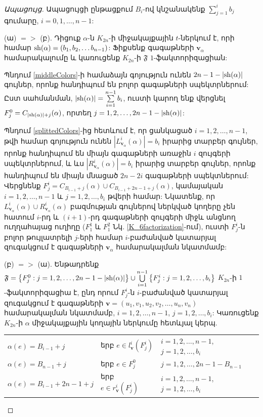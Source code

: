 \begin{proof}[Ապացույց]
Ապացույցի ընթացքում $B_i$-ով կնշանակենք $\sum\limits_{j=1}^{i}b_j$ գումարը, $i=0,1,\ldots,n-1$:

\begin{description}
\item{(ա) $=>$ (բ)}. Դիցուք $\alpha$-ն $K_{2n}$-ի միջակայքային $t$-ներկում է, որի համար ${\rm sh}(\alpha) = (b_1, b_2, \ldots b_{n-1})$: Ֆիքսենք գագաթների $\mathbf{v}_\alpha$ համարակալումը և կառուցենք $K_{2n}$-ի $\mathfrak{F}$ $1$-ֆակտորիզացիան: 

Պնդում \ref{middleColors}-ի համաձայն գոյություն ունեն $2n-1-|{\rm sh}(\alpha)|$ գույներ, որոնք հանդիպում են բոլոր գագաթների սպեկտրներում: Ըստ սահմանման, $|{\rm sh}(\alpha)| = \sum\limits_{i=1}^{n-1}b_i$, ուստի կարող ենք վերցնել $F_j^0 = C_{|{\rm sh}(\alpha)|+j}(\alpha)$, որտեղ $j=1,2,\ldots,2n-1-|{\rm sh}(\alpha)|$:

Պնդում \ref{splittedColors}-ից հետևում է, որ ցանկացած $i=1,2,\ldots,n-1$, թվի համար գոյություն ունեն $|L_{\mathbf{v}_\alpha}^i(\alpha)|=b_i$ իրարից տարբեր գույներ, որոնք հանդիպում են միայն գագաթների առաջին $i$ զույգերի սպեկտրներում, և ևս $|R_{\mathbf{v}_\alpha}^i(\alpha)|=b_i$ իրարից տարբեր գույներ, որոնք հանդիպում են միայն մնացած $2n-2i$ գագաթների սպեկտներում: Վերցնենք $F^i_j = C_{B_{i-1} + j}(\alpha) \cup C_{B_{i-1} + 2n - 1 + j}(\alpha)$, կամայական $i=1,2,\ldots,n-1$ և $j=1,2,\ldots,b_i$ թվերի համար: Նկատենք, որ $L_{\mathbf{v}_\alpha}^i(\alpha) \cup R_{\mathbf{v}_\alpha}^i(\alpha)$ բազմության գույներով ներկված կողերը չեն հատում $i$-րդ և $(i+1)$-րդ գագաթների զույգերի միջև անցնող ուղղահայաց ուղիղը ($F_1^1$ և $F_1^2$ Նկ. \ref{K_6factorization}-ում), ուստի $F^i_j$-ն բոլոր թույլատրելի $j$-երի համար $i$-բաժանված կատարյալ զուգակցում է գագաթների $\mathbf{v}_\alpha$ համարակալման նկատմամբ:

\item{(բ) $=>$ (ա)}. Ենթադրենք $\mathfrak{F} = 
\left\{ F^0_j : j=1,2,\ldots,2n-1-|{\rm sh}(\alpha)| \right\}
\cup
\bigcup\limits_{i=1}^{n-1}\left\{F^i_j : j=1,2,\ldots,b_i\right\}$ $K_{2n}$-ի $1$-ֆակտորիզացիա է, ընդ որում $F_j^i$-ն $i$-բաժանված կատարյալ զուգակցում է գագաթների $\mathbf{v}=\left(u_1,v_1, u_2,v_2, \ldots,u_n,v_n\right)$ համարակալման նկատմամբ, $i=1,2,\ldots,n-1$, $j=1,2,\ldots,b_i$: Կառուցենք $K_{2n}$-ի $\alpha$ միջակայքային կողային ներկումը հետևյալ կերպ.

\begin{tabular}{lll}
$\alpha(e)=B_{i-1} + j$ & երբ $e \in l_{\mathbf{v}}^i(F_j^i)$ & $i=1,2,\ldots,n-1$, $j=1,2,\ldots,b_i$ \\
$\alpha(e)=B_{n-1} + j$ & երբ $e \in F_j^0$ & $j=1,2,\ldots,2n-1-B_{n-1}$\\
$\alpha(e)=B_{i-1} + 2n - 1 + j$ & երբ $e \in r_{\mathbf{v}}^i(F_j^i)$ & $i=1,2,\ldots,n-1$, $j=1,2,\ldots,b_i$
\end{tabular}


\end{description}
\end{proof}
